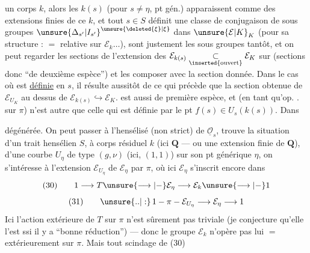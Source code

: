 un corps $k$, alors les $k(s)$ (pour $s\ne\eta$, pt gén.) apparaissent comme des extensions finies de ce $k$, et tout $s\in S$ définit une classe de conjugaison de sous groupes $\unsure{\Delta_{s'}|I_{s'}}^{\unsure{\deleted{\xi}|\xi}}$ dans $\unsure{\mathcal E|K}_K$ (pour sa structure :  $=$  relative sur $\mathcal E_k\ldots$),   sont justement les sous groupes      tantôt, et on peut regarder les sections de l'extension  des $\mathcal E_{k(s)}\underset{\inserted{\text{ouvert}}}{\subset}\mathcal E_K$ sur (sections donc ``de deuxième espèce'') et les composer avec la section donnée. Dans le cas où   est \uline{définie} en $s$, il résulte aussitôt de ce qui précède que la section  obtenue de $\mathcal E_{U_K}$ au dessus de $\mathcal E_{k(s)}\hookrightarrow\mathcal E_K$. est aussi de première espèce, et  (en tant qu'op. .  sur $\pi$)  n'est autre que celle qui est définie par le pt $f(s)\in U_s(k(s))$. Dans

dégénérée. On peut passer  à
l'hensélisé (non strict) de $\underline{\mathcal O}_s$, 
trouve la situation d'un trait hensélien
$S$, à corps résiduel $k$ (ici $\mathbf Q$ --- ou une
extension finie de $\mathbf Q$), d'une
courbe $U_\eta$ de type $(g,\nu)$ (ici, $(1,1)$)
sur son pt générique $\eta$, on s'intéresse
à l'extension $\mathcal E_{U_\eta}$ de $\mathcal E_\eta$ par $\pi$,
où ici $\mathcal E_\eta$ s'inscrit encore dans
\[
(30)\qquad 1\longrightarrow T\unsure{\longrightarrow|-}\mathcal E_\eta\longrightarrow\mathcal E_k\unsure{\longrightarrow|-}1
\]
\[
(31)\qquad \unsure{..|:}\,1-\pi-\mathcal E_{U_\eta}\longrightarrow\mathcal E_\eta\longrightarrow1
\]
Ici l'action extérieure de $T$ sur
$\pi$ n'est  sûrement pas triviale (je
conjecture qu'elle l'est ssi il y
a ``bonne réduction'') --- donc le groupe
$\mathcal E_k$ n'opère pas lui $=$ extérieurement
sur $\pi$. Mais tout scindage de (30)

